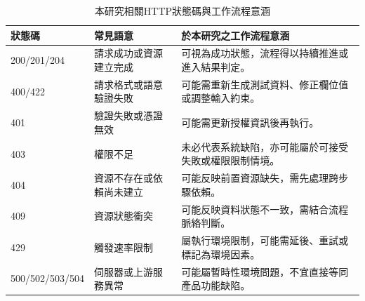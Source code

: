 \begin{ZhChapter}
\begin{table}[htbp]
\centering
\caption{本研究相關HTTP狀態碼與工作流程意涵}
\label{tab:http_status_workflow}
\scriptsize
\renewcommand{\arraystretch}{1.3}
\begin{tabularx}{\textwidth}{p{2.2cm} p{4.2cm} X}
\toprule
\textbf{狀態碼} & \textbf{常見語意} & \textbf{於本研究之工作流程意涵} \\
\midrule
200/201/204 & 請求成功或資源建立完成 & 可視為成功狀態，流程得以持續推進或進入結果判定。 \\
400/422 & 請求格式或語意驗證失敗 & 可能需重新生成測試資料、修正欄位值或調整輸入約束。 \\
401 & 驗證失敗或憑證無效 & 可能需更新授權資訊後再執行。 \\
403 & 權限不足 & 未必代表系統缺陷，亦可能屬於可接受失敗或權限限制情境。 \\
404 & 資源不存在或依賴尚未建立 & 可能反映前置資源缺失，需先處理跨步驟依賴。 \\
409 & 資源狀態衝突 & 可能反映資料狀態不一致，需結合流程脈絡判斷。 \\
429 & 觸發速率限制 & 屬執行環境限制，可能需延後、重試或標記為環境因素。 \\
500/502/503/504 & 伺服器或上游服務異常 & 可能屬暫時性環境問題，不宜直接等同產品功能缺陷。 \\
\bottomrule
\end{tabularx}
\end{table}


\end{ZhChapter}
